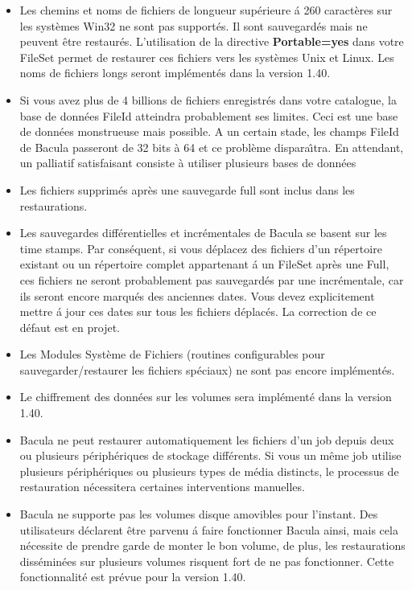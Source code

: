 \begin{itemize}
\item Les chemins et noms de fichiers de longueur sup\'erieure \'a 260 caract\`eres 
   sur les syst\`emes Win32 ne sont pas support\'es. Il sont sauvegard\'es mais 
   ne peuvent \^etre restaur\'es. L'utilisation de la directive {\bf Portable=yes}
   dans votre FileSet permet de restaurer ces fichiers vers les syst\`emes 
   Unix et Linux. Les noms de fichiers longs seront impl\'ement\'es dans la  
   version 1.40.
\item Si vous avez plus de 4 billions de fichiers enregistr\'es dans votre 
   catalogue, la base de donn\'ees FileId atteindra probablement ses limites. 
   Ceci est une base de donn\'ees monstrueuse mais possible. A un certain stade,
   les champs  FileId de Bacula passeront de 32 bits \`a 64 et ce probl\`eme
   dispara{\^\i}tra. En attendant, un palliatif  satisfaisant consiste \`a
   utiliser plusieurs bases de donn\'ees  
\item Les fichiers supprim\'es apr\`es une sauvegarde full sont inclus dans
   les restaurations. 
\item Les sauvegardes diff\'erentielles et incr\'ementales de Bacula se basent sur 
   les time stamps. Par cons\'equent, si vous d\'eplacez des fichiers d'un r\'epertoire 
   existant ou un r\'epertoire complet appartenant \'a un FileSet apr\`es une Full, 
   ces fichiers ne seront probablement pas sauvegard\'es par une incr\'ementale, 
   car ils seront encore marqu\'es des anciennes dates. Vous devez explicitement 
   mettre \'a jour ces dates sur tous les fichiers d\'eplac\'es. La correction de ce 
   d\'efaut est en projet.
\item Les Modules Syst\`eme de Fichiers (routines configurables pour 
   sauvegarder/restaurer les fichiers sp\'eciaux) ne sont pas encore impl\'ement\'es.
\item Le chiffrement des donn\'ees sur les volumes sera impl\'ement\'e dans la version 1.40. 
\item Bacula ne peut restaurer automatiquement les fichiers d'un job depuis 
   deux ou plusieurs p\'eriph\'eriques de stockage diff\'erents. Si vous 
   un m\^eme job utilise plusieurs p\'eriph\'eriques ou plusieurs types de 
   m\'edia distincts, le processus de restauration n\'ecessitera certaines 
   interventions manuelles. 
\item Bacula ne supporte pas les volumes disque amovibles pour l'instant.
  Des utilisateurs d\'eclarent \^etre parvenu \'a faire fonctionner Bacula 
  ainsi, mais cela n\'ecessite de prendre garde de monter le bon volume, de 
  plus, les restaurations diss\'emin\'ees sur plusieurs volumes risquent 
  fort de ne pas fonctionner. Cette fonctionnalit\'e est pr\'evue pour la version 
  1.40. 
\end{itemize}

